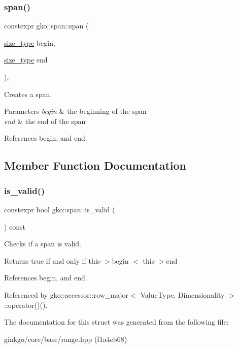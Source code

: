 \subsubsection{\texorpdfstring{span()}{span()}\hspace{0.1cm}{\footnotesize\ttfamily [2/2]}}
{\footnotesize\ttfamily constexpr gko\+::span\+::span (\begin{DoxyParamCaption}\item[{\hyperlink{namespacegko_a6e5c95df0ae4e47aab2f604a22d98ee7}{size\+\_\+type}}]{begin,  }\item[{\hyperlink{namespacegko_a6e5c95df0ae4e47aab2f604a22d98ee7}{size\+\_\+type}}]{end }\end{DoxyParamCaption})\hspace{0.3cm}{\ttfamily [inline]}, {\ttfamily [noexcept]}}



Creates a span. 


\begin{DoxyParams}{Parameters}
{\em begin} & the beginning of the span \\
\hline
{\em end} & the end of the span \\
\hline
\end{DoxyParams}


References begin, and end.



\subsection{Member Function Documentation}
\mbox{\label{structgko_1_1span_a32a87f434708e6857820858503f9b133}} 
\subsubsection{\texorpdfstring{is\+\_\+valid()}{is\_valid()}}
{\footnotesize\ttfamily constexpr bool gko\+::span\+::is\+\_\+valid (\begin{DoxyParamCaption}{ }\end{DoxyParamCaption}) const\hspace{0.3cm}{\ttfamily [inline]}}



Checks if a span is valid. 

\begin{DoxyReturn}{Returns}
true if and only if {\ttfamily this-\/$>$begin $<$ this-\/$>$end} 
\end{DoxyReturn}


References begin, and end.



Referenced by gko\+::accessor\+::row\+\_\+major$<$ Value\+Type, Dimensionality $>$\+::operator()().



The documentation for this struct was generated from the following file\+:\begin{DoxyCompactItemize}
\item 
ginkgo/core/base/range.\+hpp (f1a4eb68)\end{DoxyCompactItemize}
